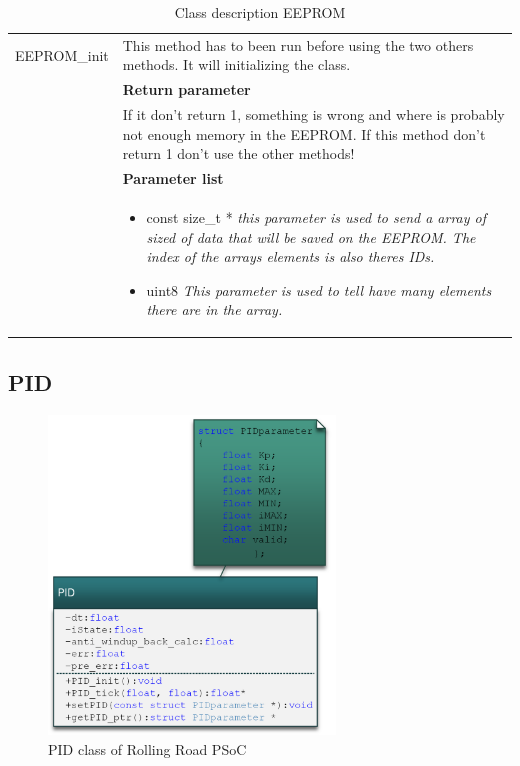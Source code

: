 \begin{table}[h!]
\begin{tabular}{|p{5 cm}|p{10 cm}|}
		EEPROM\_init
		& This method has to been run before using the two others methods. It will initializing the class.
		\\ & \textbf{Return parameter}
		\\ & If it don't return 1, something is wrong and where is probably not enough memory in the EEPROM. If this method don't return 1 don't use the other methods!   
		\\ & \textbf{Parameter list}
		\\ & \begin{itemize}
			\item {\large const size\_t *}
			\subitem \textit{this parameter is used to send a array of sized of data that will be saved on the EEPROM. The index of the arrays elements is also theres IDs.}
			\item {\large uint8}
			\subitem \textit{This parameter is used to tell have many elements there are in the array.}
		\end{itemize}
		\\ \hline

	\end{tabular}
	\caption{Class description EEPROM}
	\label{table:Class_description_EEPROM_RR_PSoC}
\end{table}

\subsection{PID}

\begin{figure}[H]
	\centering
	\includegraphics [width=3in]{Software/Pictures/klassediagram_PID.png}
	\caption{PID class of Rolling Road PSoC}
	\label{fig:Class_diagram_PID_RR_PSoC}
\end{figure}


